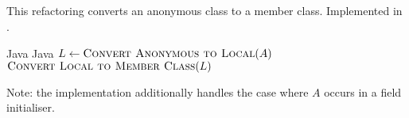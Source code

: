 \subsection{}
This refactoring converts an anonymous class to a member class. Implemented in .

\begin{algorithm}
\caption{$\refactoring{Convert Anonymous to Nested}(A : \type{AnonymousClass}) : \type{MemberType}$}
\begin{algorithmic}[1]
\REQUIRE Java
\ENSURE Java
\medskip
\STATE $L \leftarrow \textsc{Convert Anonymous to Local}(A)$
\RETURN $\textsc{Convert Local to Member Class}(L)$
\end{algorithmic}
\end{algorithm}

Note: the implementation additionally handles the case where $A$ occurs in a field initialiser.
